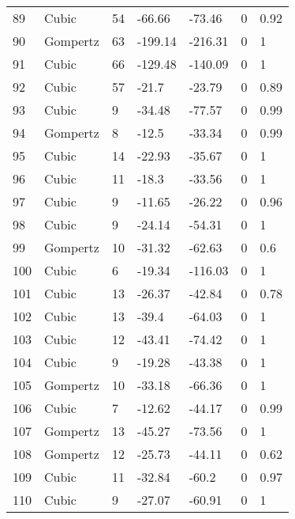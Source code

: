 \documentclass[11pt]{article}
\begin{document}
\begin{center}
\begin{longtable}{lllllll}
        89  & Cubic     & 54              & -66.66  & -73.46  & 0       & 0.92 \\
        90  & Gompertz  & 63              & -199.14 & -216.31 & 0       & 1    \\
        91  & Cubic     & 66              & -129.48 & -140.09 & 0       & 1    \\
        92  & Cubic     & 57              & -21.7   & -23.79  & 0       & 0.89 \\
        93  & Cubic     & 9               & -34.48  & -77.57  & 0       & 0.99 \\
        94  & Gompertz  & 8               & -12.5   & -33.34  & 0       & 0.99 \\
        95  & Cubic     & 14              & -22.93  & -35.67  & 0       & 1    \\
        96  & Cubic     & 11              & -18.3   & -33.56  & 0       & 1    \\
        97  & Cubic     & 9               & -11.65  & -26.22  & 0       & 0.96 \\
        98  & Cubic     & 9               & -24.14  & -54.31  & 0       & 1    \\
        99  & Gompertz  & 10              & -31.32  & -62.63  & 0       & 0.6  \\
        100 & Cubic     & 6               & -19.34  & -116.03 & 0       & 1    \\
        101 & Cubic     & 13              & -26.37  & -42.84  & 0       & 0.78 \\
        102 & Cubic     & 13              & -39.4   & -64.03  & 0       & 1    \\
        103 & Cubic     & 12              & -43.41  & -74.42  & 0       & 1    \\
        104 & Cubic     & 9               & -19.28  & -43.38  & 0       & 1    \\
        105 & Gompertz  & 10              & -33.18  & -66.36  & 0       & 1    \\
        106 & Cubic     & 7               & -12.62  & -44.17  & 0       & 0.99 \\
        107 & Gompertz  & 13              & -45.27  & -73.56  & 0       & 1    \\
        108 & Gompertz  & 12              & -25.73  & -44.11  & 0       & 0.62 \\
        109 & Cubic     & 11              & -32.84  & -60.2   & 0       & 0.97 \\
        110 & Cubic     & 9               & -27.07  & -60.91  & 0       & 1    \\

\end{longtable}
\end{center}
\end{document}
